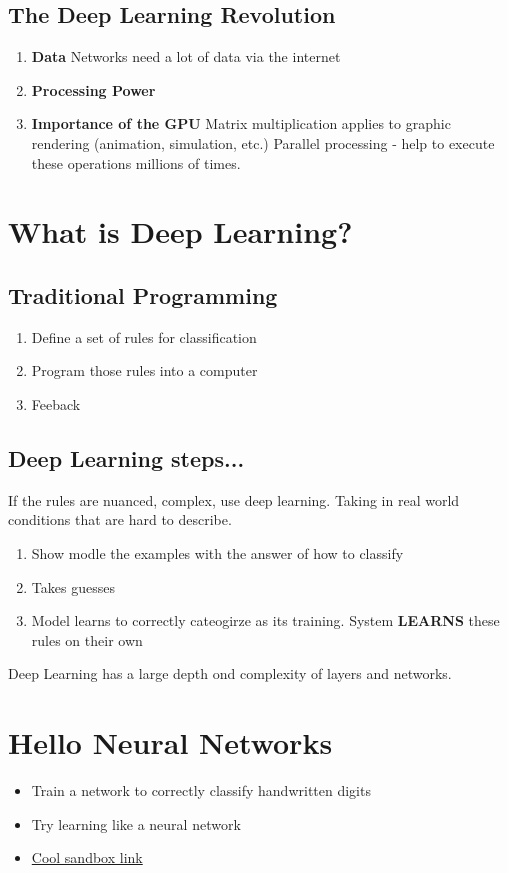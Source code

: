\documentclass{article}
\begin{document}
\subsection{The Deep Learning Revolution}
\begin{enumerate}
    \item \textbf{Data}
        Networks need a lot of data via the internet
    \item \textbf{Processing Power}
    \item \textbf{Importance of the GPU}
        Matrix multiplication applies to graphic rendering (animation, simulation, etc.) Parallel processing - help to execute these operations millions of times. 
\end{enumerate}

\section{What is Deep Learning?}
\subsection{Traditional Programming}
\begin{enumerate}
    \item Define a set of rules for classification
    \item Program those rules into a computer
    \item Feeback
\end{enumerate}
\subsection{Deep Learning steps...}
If the rules are nuanced, complex, use deep learning. Taking in real world conditions that are hard to describe. 
\begin{enumerate}
    \item Show modle the examples with the answer of how to classify
    \item Takes guesses
    \item Model learns to correctly cateogirze as its training. System \textbf{LEARNS} these rules on their own
\end{enumerate}
Deep Learning has a large depth ond complexity of layers and networks. 
\section{Hello Neural Networks}
\begin{itemize}
    \item Train a network to correctly classify handwritten digits
    \item Try learning like a neural network
    \item \href{https://build.nvidia.com/}{Cool sandbox link}
\end{itemize}
\end{document}
